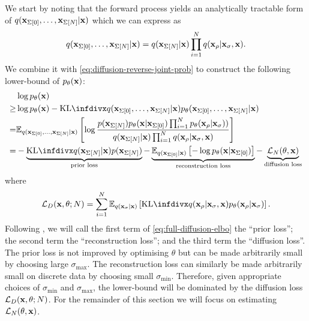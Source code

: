 We start by noting that the forward process yields an analytically tractable form of $q({\mathbf{x}}_{\Sigma[0]},\ldots,{\mathbf{x}}_{\Sigma[N]}|{\mathbf{x}})$ which we can express as
\begin{equation}
    q({\mathbf{x}}_{\Sigma[0]},\ldots,{\mathbf{x}}_{\Sigma[N]}|{\mathbf{x}}) = q({\mathbf{x}}_{\Sigma[N]}|{\mathbf{x}}) \prod_{i=1}^N q({\mathbf{x}}_{\rho} | {\mathbf{x}}_{\sigma}, {\mathbf{x}}).
\end{equation}We combine it with \cref{eq:diffusion-reverse-joint-prob} to construct the following lower-bound of $p_\theta({\mathbf{x}})$:
\begin{align}
    &\log p_\theta(\rvx) \\
    \geq &\log p_\theta(\rvx) - \kl{q(\rvx_{\Sigma[0]},\ldots,\rvx_{\Sigma[N]}|\rvx)}{p_\theta(\rvx_{\Sigma[0]},\ldots,\rvx_{\Sigma[N]}|\rvx)} \\
    = &\EX_{q(\rvx_{\Sigma[0]},\ldots,\rvx_{\Sigma[N]}|\rvx)} \left[ \log \frac{p(\rvx_{\Sigma[N]}) p_\theta(\rvx|\rvx_{\Sigma[0]}) \prod_{i=1}^N p_\theta(\rvx_{\rho} | \rvx_{\sigma}) ) }{q(\rvx_{\Sigma[N]}|\rvx) \prod_{i=1}^N q(\rvx_{\rho} | \rvx_{\sigma}, \rvx)} \right] \\
    = & -\underbrace{\kl{q(\rvx_{\Sigma[N]}|\rvx)}{p(\rvx_{\Sigma[N]})}}_\text{prior loss} - \underbrace{\EX_{q(\rvx_{\Sigma[0]}|\rvx)} \left[ - \log p_\theta(\rvx|\rvx_{\Sigma[0]}) \right]}_\text{reconstruction loss} - \underbrace{\mathcal{L}_N(\theta, \rvx)}_\text{diffusion loss} \label{eq:full-diffusion-elbo}
\end{align}
where
\begin{align}
    \mathcal{L}_D(\rvx, \theta; N) = \sum_{i=1}^N \EX_{q(\rvx_{\sigma}|\rvx)} \left[ \kl{q(\rvx_{\rho} | \rvx_{\sigma}, \rvx)}{p_\theta(\rvx_{\rho} | \rvx_{\sigma})} \right].
\end{align}
Following \citet{kingma2021variational}, we will call the first term of \cref{eq:full-diffusion-elbo} the ``prior loss''; the second term the ``reconstruction loss''; and the third term the ``diffusion loss''. The prior loss is not improved by optimising $\theta$ but can be made arbitrarily small by choosing large $\sigma_\text{max}$. The reconstruction loss can similarly be made arbitrarily small on discrete data by choosing small $\sigma_\text{min}$. Therefore, given appropriate choices of $\sigma_\text{min}$ and $\sigma_\text{max}$, the lower-bound will be dominated by the diffusion loss $\mathcal{L}_D({\mathbf{x}}, \theta; N)$. For the remainder of this section we will focus on estimating $\mathcal{L}_N(\theta, {\mathbf{x}})$.

